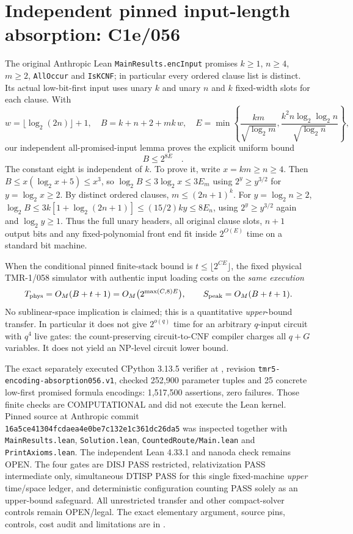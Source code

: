 \documentclass[11pt]{article}
\begin{document}
\section{Independent pinned input-length absorption: C1e/056}
The original Anthropic Lean \texttt{MainResults.encInput} promises
$k\ge1$, $n\ge4$, $m\ge2$, \texttt{AllOccur} and \texttt{IsKCNF};
in particular every ordered clause list is distinct.
Its actual low-bit-first input uses unary $k$ and unary $n$
and $k$ fixed-width slots for each clause.
With
\[
 w=\lfloor\log_2(2n)\rfloor+1,\quad
 B=k+n+2+mk\,w,\quad
 E=\min\left\{\frac{km}{\sqrt{\log_2m}},
 \frac{k^2n\log_2\log_2n}{\sqrt{\log_2n}}\right\},
\]
our independent all-promised-input lemma proves the explicit
uniform bound
\[
 \boxed{\quad B\le2^{8E}\quad}.
\]
The constant eight is independent of $k$. To prove it, write
$x=km\ge n\ge4$. Then $B\le x(\log_2x+5)\le x^3$,
so $\log_2 B\le3\log_2x\le3E_m$ using
$2^y\ge y^{3/2}$ for $y=\log_2x\ge2$.
By distinct ordered clauses, $m\le(2n+1)^k$.
For $y=\log_2n\ge2$,
$\log_2 B\le3k[1+\log_2(2n+1)]
\le(15/2)ky\le8E_n$,
using $2^y\ge y^{3/2}$ again and $\log_2y\ge1$.
Thus the full unary headers, all original clause slots,
$n+1$ output bits and any fixed-polynomial front end
fit inside $2^{O(E)}$ time on a standard bit machine.

When the conditional pinned finite-stack bound is
$t\le\lfloor2^{CE}\rfloor$, the fixed physical TMR-1/058
simulator with authentic input loading costs on the
\emph{same execution}
\[
 T_{\rm phys}=O_M(B+t+1)
  =O_M\bigl(2^{\max(C,8)E}\bigr),
 \qquad S_{\rm peak}=O_M(B+t+1).
\]
No sublinear-space implication is claimed; this is a
quantitative \emph{upper}-bound transfer.
In particular it does not give $2^{o(q)}$ time for an
arbitrary $q$-input circuit with $q^4$ live gates:
the count-preserving circuit-to-CNF compiler charges
all $q+G$ variables. It does not yield an NP-level
circuit lower bound.

The exact separately executed CPython 3.13.5 verifier
at ,
revision \texttt{tmr5-encoding-absorption056.v1},
checked 252,900 parameter tuples and 25 concrete
low-first promised formula encodings:
1,517,500 assertions, zero failures.
Those finite checks are COMPUTATIONAL and did not execute
the Lean kernel.
Pinned source at Anthropic commit
\texttt{16a5ce41304fcdaea4e0be7c132e1c361dc26da5}
was inspected together with
\texttt{MainResults.lean}, \texttt{Solution.lean},
\texttt{CountedRoute/Main.lean} and \texttt{PrintAxioms.lean}.
The independent Lean 4.33.1 and nanoda check remains OPEN.
The four gates are DISJ PASS restricted, relativization
PASS intermediate only, simultaneous DTISP PASS for
this single fixed-machine \emph{upper} time/space ledger,
and deterministic configuration counting PASS solely
as an upper-bound safeguard. All unrestricted transfer
and other compact-solver controls remain OPEN/legal.
The exact elementary argument, source pins, controls,
cost audit and limitations are in
.
\end{document}
